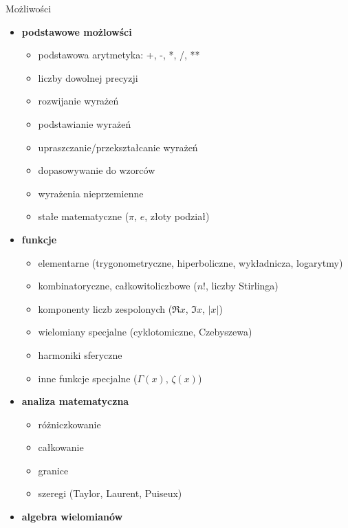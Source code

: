 \documentclass[10pt]{beamer}
\begin{document}
\begin{frame}{Możliwości}
  \scriptsize
  \begin{multicols}{2}
    \begin{itemize}
      \item \textbf{podstawowe możlowści}
        \begin{itemize}
          \tiny
          \item podstawowa arytmetyka: +, -, *, /, **
          \item liczby dowolnej precyzji
          \item rozwijanie wyrażeń
          \item podstawianie wyrażeń
          \item upraszczanie/przekształcanie wyrażeń
          \item dopasowywanie do wzorców
          \item wyrażenia nieprzemienne
          \item stałe matematyczne ($\pi$, $e$, złoty podział)
        \end{itemize}
      \item \textbf{funkcje}
        \begin{itemize}
          \tiny
          \item elementarne (trygonometryczne, hiperboliczne, wykładnicza, logarytmy)
          \item kombinatoryczne, całkowitoliczbowe ($n!$, liczby Stirlinga)
          \item komponenty liczb zespolonych ($\Re{x}$, $\Im{x}$, $\left|{x}\right|$)
          \item wielomiany specjalne (cyklotomiczne, Czebyszewa)
          \item harmoniki sferyczne
          \item inne funkcje specjalne ($\Gamma{\left(x \right)}$, $\zeta{\left(x \right)}$)
        \end{itemize}
      \item \textbf{analiza matematyczna}
        \begin{itemize}
          \tiny
          \item różniczkowanie
          \item całkowanie
          \item granice
          \item szeregi (Taylor, Laurent, Puiseux)
        \end{itemize}
      \item \textbf{algebra wielomianów}

\end{itemize}
\end{multicols}
\end{frame}
\end{document}
